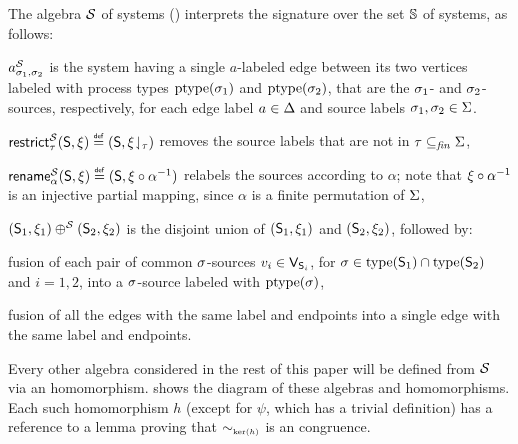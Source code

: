 The algebra $\algof{S}$ of systems () interprets
the \hrtext{} signature over the set $\systems$ of systems, as
follows: \begin{compactitem}[-]
\item $\sgraph{a}{\asrc_1}{\asrc_2}{\algof{S}}$ is the system having a
  single $a$-labeled edge between its two vertices labeled with
  process types $\ptypeof{\asrc_1}$ and $\ptypeof{\asrc_2}$, that are
  the $\asrc_1$- and $\asrc_2$-sources, respectively, for each edge
  label $a\in\ealpha$ and source labels $\asrc_1,\asrc_2\in\sourcelabels$.
\item $\restrict{\slabs}{\algof{S}}(\asys,\sources) \isdef
  (\asys,\proj{\sources}{\slabs})$ removes the source labels that are
  not in $\slabs \finsubseteq \sourcelabels$,
\item
  $\rename{\alpha}{\algof{S}}(\asys,\sources) \isdef
  (\asys,\sources\circ\alpha^{-1})$ relabels the sources according to
  $\alpha$; note that $\sources\circ\alpha^{-1}$ is an injective
  partial mapping, since $\alpha$ is a finite permutation of
  $\sourcelabels$,
\item $(\asys_1,\sources_1) \pop{\algof{S}} (\asys_2,\sources_2)$ is
  the disjoint union of $(\asys_1,\sources_1)$ and
  $(\asys_2,\sources_2)$, followed by: \begin{compactitem}[*]
  \item fusion of each pair of common $\asrc$-sources $v_i \in
    \vertof{\asys_i}$, for $\asrc\in\typeof{\asys_1} \cap
    \typeof{\asys_2}$ and $i=1,2$, into a $\asrc$-source labeled with
    $\ptypeof{\asrc}$,
  \item fusion of all the edges with the same label and endpoints into
    a single edge with the same label and endpoints.
  \end{compactitem}
\end{compactitem}
Every other \hrtext{} algebra considered in the rest of this paper
will be defined from $\algof{S}$ via an
homomorphism.  shows the diagram of these algebras
and homomorphisms. Each such homomorphism $h$ (except for $\psi$,
which has a trivial definition) has a reference to a lemma proving
that $\kerof{h}$ is an \hrtext{} congruence.

